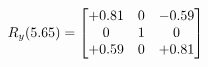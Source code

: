 \documentclass[preview]{standalone}
\begin{document}
\begin{align*}
\special{dvisvgm:raw <g id='unique000'>}R_{y}(5.65) = \begin{bmatrix}+0.81 & 0 & -0.59 \\0 & 1 & 0 \\+0.59 & 0 & +0.81\end{bmatrix}\special{dvisvgm:raw </g>}
\end{align*}
\end{document}
